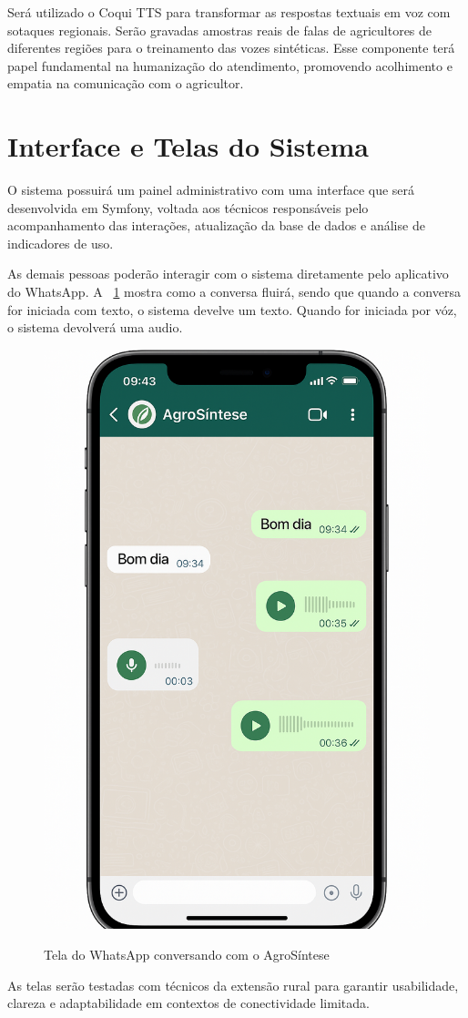 Será utilizado o Coqui TTS para transformar as respostas textuais em voz com sotaques regionais. Serão gravadas amostras reais de falas de agricultores de diferentes regiões para o treinamento das vozes sintéticas. Esse componente terá papel fundamental na humanização do atendimento, promovendo acolhimento e empatia na comunicação com o agricultor.

\section{Interface e Telas do Sistema}

O sistema possuirá um painel administrativo com uma interface que será desenvolvida em Symfony, voltada aos técnicos responsáveis pelo acompanhamento das interações, atualização da base de dados e análise de indicadores de uso. 

As demais pessoas poderão interagir com o sistema diretamente pelo aplicativo do WhatsApp.
A ~\ref{fig:whatsapptela} mostra como a conversa fluirá, sendo que quando a conversa for iniciada com texto, o sistema develve um texto. Quando for iniciada por vóz, o sistema devolverá uma audio.

\begin{figure}[h]
	\centering
	\caption{Tela do WhatsApp conversando com o AgroSíntese }
	\includegraphics[width=0.5\linewidth,scale=1.0]{images/agro-sintese-whats.png}
	\label{fig:whatsapptela}
\end{figure}


As telas serão testadas com técnicos da extensão rural para garantir usabilidade, clareza e adaptabilidade em contextos de conectividade limitada.

